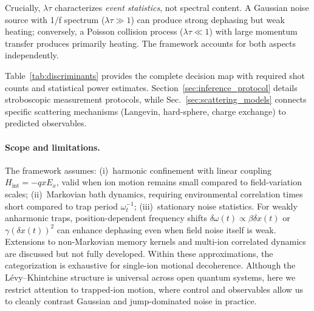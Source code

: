 Crucially, $\lambda\tau$ characterizes \emph{event statistics}, not spectral content. A Gaussian noise source with 1/f spectrum ($\lambda\tau \gg 1$) can produce strong dephasing but weak heating; conversely, a Poisson collision process ($\lambda\tau \ll 1$) with large momentum transfer produces primarily heating. The framework accounts for both aspects independently.

Table~\ref{tab:discriminants} provides the complete decision map with required shot counts and statistical power estimates. Section~\ref{sec:inference_protocol} details stroboscopic measurement protocols, while Sec.~\ref{sec:scattering_models} connects specific scattering mechanisms (Langevin, hard-sphere, charge exchange) to predicted observables.

\paragraph{Scope and limitations.}
The framework assumes: (i)~harmonic confinement with linear coupling $H_{\text{int}} = -qxE_x$, valid when ion motion remains small compared to field-variation scales; (ii)~Markovian bath dynamics, requiring environmental correlation times short compared to trap period $\omega_t^{-1}$; (iii)~stationary noise statistics. For weakly anharmonic traps, position-dependent frequency shifts $\delta\omega(t) \propto \beta \delta x(t)$ or $\gamma (\delta x(t))^2$ can enhance dephasing even when field noise itself is weak. Extensions to non-Markovian memory kernels and multi-ion correlated dynamics are discussed but not fully developed. Within these approximations, the categorization is exhaustive for single-ion motional decoherence.
Although the L\'evy--Khintchine structure is universal across open quantum systems, here we restrict attention to trapped-ion motion, where control and observables allow us to cleanly contrast Gaussian and jump-dominated noise in practice.